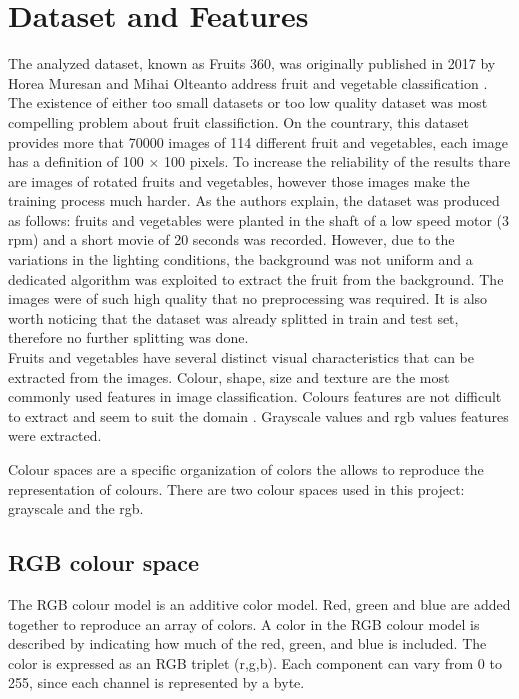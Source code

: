 \documentclass{article}
\begin{document}
\section{Dataset and Features}
The analyzed dataset, known as Fruits 360, was originally published in 2017  by Horea Muresan and Mihai Olteanto address fruit and vegetable classification \cite{dataset}. The existence of either too small datasets or too low quality dataset was most compelling problem about fruit classifiction.  On the countrary, this dataset provides more that 70000 images of 114 different fruit and vegetables, each image has a definition of 100 $\times$ 100 pixels. To increase the reliability of the results thare are images of rotated fruits and vegetables, however those images make the training process much harder.
As the authors explain, the dataset was produced as follows: fruits and vegetables were planted in the shaft of a low speed motor (3 rpm) and a short movie of 20 seconds was recorded. However, due to the variations in the lighting conditions, the background was not uniform and a dedicated algorithm was exploited to extract the fruit from the background. The images were of such high quality that no preprocessing was required.
It is also worth noticing that the dataset was already splitted in train and test set, therefore no further splitting was done.\\
Fruits and vegetables have several distinct visual characteristics that can be extracted from the images. Colour, shape, size and texture are the most commonly used features in image classification. Colours features are not difficult to extract and seem to suit the domain \cite{review}. Grayscale values and rgb values features were extracted. 

Colour spaces are a specific organization of colors the allows to  reproduce the representation of colours. There are two colour spaces used in this project: grayscale and the rgb.
\subsection{RGB colour space}
The RGB colour model is an additive color model. Red, green and blue are added together to reproduce an array of colors. A color in the RGB colour model is described by indicating how much of the red, green, and blue is included. The color is expressed as an RGB triplet (r,g,b). Each component can vary from 0 to 255, since each channel is represented by a byte.
\end{document}
